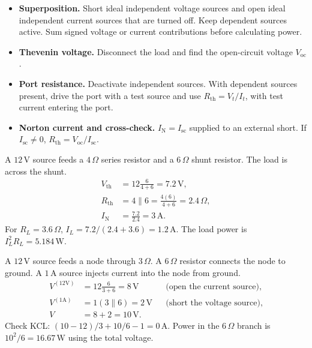 \documentclass[12pt,a4paper]{article}
\begin{document}
\begin{itemize}[leftmargin=*, itemsep=3pt, topsep=4pt]
  \item \textbf{Superposition.} Short ideal independent voltage sources and open ideal independent current sources that are turned off. Keep dependent sources active. Sum signed voltage or current contributions before calculating power.
  \item \textbf{Thevenin voltage.} Disconnect the load and find the open-circuit voltage \(V_{\mathrm{oc}}\).
  \item \textbf{Port resistance.} Deactivate independent sources. With dependent sources present, drive the port with a test source and use \(R_{\mathrm{th}}=V_t/I_t\), with test current entering the port.
  \item \textbf{Norton current and cross-check.} \(I_{\mathrm N}=I_{\mathrm{sc}}\) supplied to an external short. If \(I_{\mathrm{sc}}\ne0\), \(R_{\mathrm{th}}=V_{\mathrm{oc}}/I_{\mathrm{sc}}\).
\end{itemize}

\begin{tcolorbox}[examplebox,title={From voltage divider to load power}]
A \(12\,\mathrm V\) source feeds a \(4\,\Omega\) series resistor and a \(6\,\Omega\) shunt resistor. The load is across the shunt.
\[
\begin{aligned}
V_{\mathrm{th}} &=12\frac{6}{4+6}=7.2\,\mathrm V,\\
R_{\mathrm{th}} &=4\parallel 6=\frac{4(6)}{4+6}=2.4\,\Omega,\\
I_{\mathrm N} &=\frac{7.2}{2.4}=3\,\mathrm A.
\end{aligned}
\]
For \(R_L=3.6\,\Omega\), \(I_L=7.2/(2.4+3.6)=1.2\,\mathrm A\).
The load power is \(I_L^2R_L=5.184\,\mathrm W\).
\end{tcolorbox}

\begin{tcolorbox}[examplebox,title={Superposition with voltage and current sources}]
A \(12\,\mathrm V\) source feeds a node through \(3\,\Omega\). A \(6\,\Omega\) resistor connects the node to ground. A \(1\,\mathrm A\) source injects current into the node from ground.
\[
\begin{aligned}
V^{(12\mathrm V)} &= 12\frac{6}{3+6}=8\,\mathrm V
     &&\text{(open the current source)},\\
V^{(1\mathrm A)} &=1(3\parallel6)=2\,\mathrm V
     &&\text{(short the voltage source)},\\
V&=8+2=10\,\mathrm V.
\end{aligned}
\]
Check KCL: \((10-12)/3+10/6-1=0\,\mathrm A\). Power in the \(6\,\Omega\) branch is \(10^2/6=16.67\,\mathrm W\) using the total voltage.
\end{tcolorbox}
\end{document}
